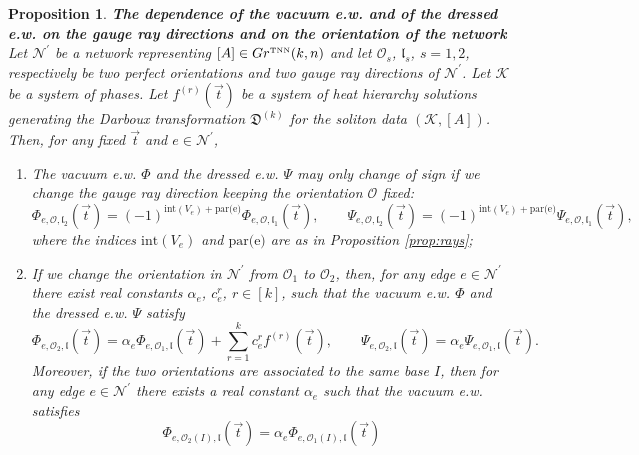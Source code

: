 \documentclass[11pt]{amsart}
\theoremstyle{plain}
\numberwithin{equation}{section}
\newtheorem{proposition}[theorem]{Proposition}
\def \GTNN {{Gr^{\mbox{\tiny TNN}} (k,n)}}
\begin{document}
\begin{proposition}\label{prop:change_orient}\textbf{The dependence of the vacuum e.w. and of the dressed e.w. on the gauge ray directions and on the orientation of the network}
Let ${\mathcal N}^{\prime}$ be a network representing $[A]\in \GTNN$ and let $\mathcal O_s$, $\mathfrak l_s $, $s=1,2$, respectively  be two perfect orientations and two gauge ray directions of ${\mathcal N}^{\prime}$. Let ${\mathcal K}$ be a system of phases. Let $f^{(r)} (\vec t)$ be a system of heat hierarchy solutions generating the Darboux transformation ${\mathfrak D}^{(k)}$ for the soliton data $(\mathcal K, [A])$. 
Then, for any fixed $\vec t$ and $e\in {\mathcal N}^{\prime}$, 
\begin{enumerate}
\item The vacuum e.w. $\Phi$ and the dressed e.w. $\Psi$ may only change of sign if we change the gauge ray direction keeping the orientation $\mathcal O$ fixed:
\begin{equation}\label{eq:phi_gauge} 
\Phi_{e, \mathcal O, \mathfrak l_2} (\vec t) = (-1)^{\mbox{int}(V_e)+\mbox{par(e)}}  \Phi_{e, \mathcal O, \mathfrak l_1} (\vec t), \quad\quad
\Psi_{e, \mathcal O, \mathfrak l_2} (\vec t) = (-1)^{\mbox{int}(V_e)+\mbox{par(e)}}  \Psi_{e, \mathcal O, \mathfrak l_1} (\vec t),
\end{equation}
where the indices $\mbox{int}(V_e)$ and $\mbox{par(e)}$ are as in Proposition \ref{prop:rays};
\item If we change the orientation in ${\mathcal N}^{\prime}$ from $\mathcal O_1$ to $\mathcal O_2$, then, for any edge $e\in {\mathcal N}^{\prime}$ there exist real constants $\alpha_e$, $c^r_e$, $r\in [k]$, such that the vacuum e.w. $\Phi$ and the dressed e.w. $\Psi$ satisfy
\begin{equation}\label{eq:phi_orient}
\Phi_{e, \mathcal O_2, \mathfrak l} (\vec t) = \alpha_e \Phi_{e, \mathcal O_1, \mathfrak l} (\vec t) + \sum_{r=1}^k c^r_e f^{(r)} (\vec t),\quad\quad
\Psi_{e, \mathcal O_2, \mathfrak l} (\vec t) = \alpha_e \Psi_{e, \mathcal O_1, \mathfrak l} (\vec t) .
\end{equation}
Moreover, if the two orientations are associated to the same base $I$, then for any edge $e\in {\mathcal N}^{\prime}$ there exists a real constant $\alpha_e$ such that the vacuum e.w. 
satisfies
\begin{equation}\label{eq:phi_orient_2}
\Phi_{e, \mathcal O_2(I), \mathfrak l} (\vec t) = \alpha_e \Phi_{e, \mathcal O_1(I), \mathfrak l} (\vec t) 
\end{equation}
\end{enumerate}
\end{proposition}
\end{document}
